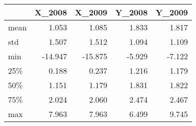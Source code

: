 \begin{tabular}{lrrrr}
\toprule
{} &        X_{2008} &  X_{2009} &  Y_{2008} &  Y_{2009} \\
\midrule
mean  &     1.053 &     1.085 &     1.833 &     1.817 \\
std   &     1.507 &     1.512 &     1.094 &     1.109 \\
min   &   -14.947 &   -15.875 &    -5.929 &    -7.122 \\
25\%   &     0.188 &     0.237 &     1.216 &     1.179 \\
50\%   &     1.151 &     1.179 &     1.831 &     1.822 \\
75\%   &     2.024 &     2.060 &     2.474 &     2.467 \\
max   &     7.963 &     7.963 &     6.499 &     9.745 \\
\bottomrule
\end{tabular}